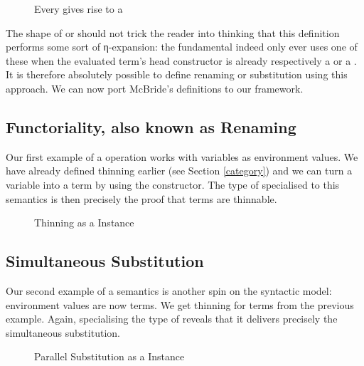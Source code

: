 \begin{figure}[h]
\caption{Every  gives rise to a \label{fig:syntactic}}
\end{figure}

The shape of  or  should not trick the reader
into thinking that this definition performs some sort of η-expansion:
the fundamental  indeed only ever uses one of these when the
evaluated term's head constructor is already respectively a 
or a . It is therefore absolutely possible to define renaming
or substitution using this approach. We can now port McBride's definitions
to our framework.


\subsection{Functoriality, also known as Renaming}

Our first example of a  operation works with variables as
environment values. We have already defined thinning earlier (see
Section \ref{category}) and we can turn a variable into a term by using
the  constructor. The type of  specialised to this
semantics is then precisely the proof that terms are thinnable.

\begin{figure}[h]
\caption{Thinning as a  Instance\label{fig:synren}}
\end{figure}

\subsection{Simultaneous Substitution}

Our second example of a semantics is another spin on the syntactic model:
environment values are now terms. We get thinning for terms from the
previous example. Again, specialising the type of 
reveals that it delivers precisely the simultaneous substitution.

\begin{figure}[h]
\caption{Parallel Substitution as a  Instance\label{fig:synsub}}
\end{figure}

